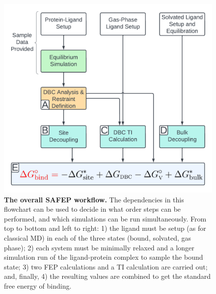 \documentclass[9pt,tutorial]{Styling/livecoms}
\begin{document}
\begin{figure}[H]
    \centering
    \includegraphics[width=.5\textwidth]{CoarseGrainedWorkflow.pdf}
    \caption[test]{\textbf{The overall SAFEP workflow.} The dependencies in this flowchart can be used to decide in what order steps can be performed, and which simulations can be run simultaneously. From top to bottom and left to right: 1) the ligand must be setup (as for classical MD) in each of the three states (bound, solvated, gas phase); 2) each system must be minimally relaxed and a longer simulation run of the ligand-protein complex to sample the bound state; 3) two FEP calculations and a TI calculation are carried out; and, finally, 4) the resulting values are combined to get the standard free energy of binding.}
    \label{fig:workflow}
    
\end{figure}
\end{document}
